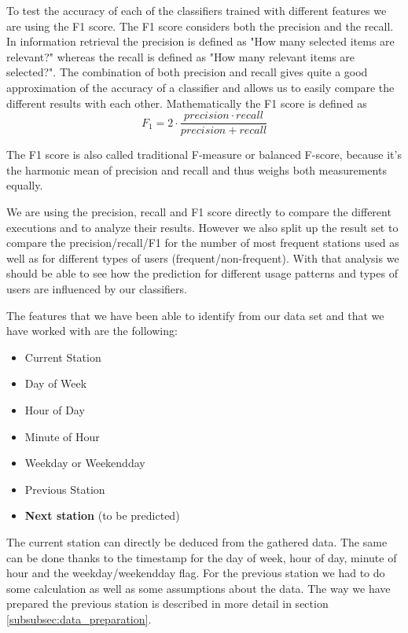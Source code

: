 To test the accuracy of each of the classifiers trained with different features we are using the F1 score. The F1 score considers both the precision and the recall. In information retrieval the precision is defined as "How many selected items are relevant?" whereas the recall is defined as "How many relevant items are selected?". The combination of both precision and recall gives quite a good approximation of the accuracy of a classifier and allows us to easily compare the different results with each other. Mathematically the F1 score is defined as 
\begin{equation}\label{equation:F1Score}
F_{1} = 2 \cdot \frac{precision \cdot recall}{precision + recall}
\end{equation}

The F1 score is also called traditional F-measure or balanced F-score, because it's the harmonic mean of precision and recall and thus weighs both measurements equally.

We are using the precision, recall and F1 score directly to compare the different executions and to analyze their results. However we also split up the result set to compare the precision/recall/F1 for the number of most frequent stations used as well as for different types of users (frequent/non-frequent). With that analysis we should be able to see how the prediction for different usage patterns and types of users are influenced by our classifiers.

The features that we have been able to identify from our data set and that we have worked with are the following:
\begin{itemize}
	\item Current Station
	\item Day of Week
	\item Hour of Day
	\item Minute of Hour
	\item Weekday or Weekendday
	\item Previous Station
	\item \textbf{Next station} (to be predicted)
\end{itemize}

The current station can directly be deduced from the gathered data. The same can be done thanks to the timestamp for the day of week, hour of day, minute of hour and the weekday/weekendday flag. For the previous station we had to do some calculation as well as some assumptions about the data. The way we have prepared the previous station is described in more detail in section \ref{subsubsec:data_preparation}.  

